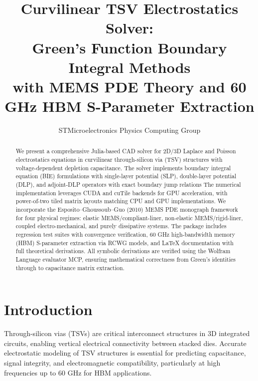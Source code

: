 \documentclass[12pt]{article}
\title{Curvilinear TSV Electrostatics Solver: \\
Green's Function Boundary Integral Methods \\
with MEMS PDE Theory and 60 GHz HBM S-Parameter Extraction}
\author{STMicroelectronics Physics Computing Group}
\date{}
\theoremstyle{definition}
\begin{document}
\maketitle

\begin{abstract}
We present a comprehensive Julia-based CAD solver for 2D/3D Laplace and Poisson electrostatics equations in curvilinear through-silicon via (TSV) structures with voltage-dependent depletion capacitance. The solver implements boundary integral equation (BIE) formulations with single-layer potential (SLP), double-layer potential (DLP), and adjoint-DLP operators with exact boundary jump relations The numerical implementation leverages CUDA and cuTile backends for GPU acceleration, with power-of-two tiled matrix layouts matching CPU and GPU implementations. We incorporate the Esposito--Ghoussoub--Guo (2010) MEMS PDE monograph framework for four physical regimes: elastic MEMS/compliant-liner, non-elastic MEMS/rigid-liner, coupled electro-mechanical, and purely dissipative systems. The package includes regression test suites with convergence verification, 60 GHz high-bandwidth memory (HBM) S-parameter extraction via RCWG models, and LaTeX documentation with full theoretical derivations. All symbolic derivations are verified using the Wolfram Language evaluator MCP, ensuring mathematical correctness from Green's identities through to capacitance matrix extraction.
\end{abstract}

\begin{center}
\end{center}


\section{Introduction}

Through-silicon vias (TSVs) are critical interconnect structures in 3D integrated circuits, enabling vertical electrical connectivity between stacked dies. Accurate electrostatic modeling of TSV structures is essential for predicting capacitance, signal integrity, and electromagnetic compatibility, particularly at high frequencies up to 60 GHz for HBM applications.
\end{document}
